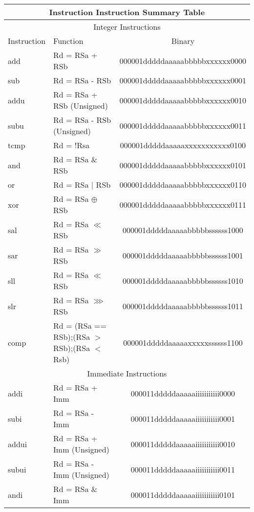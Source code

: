 \documentclass[letterpaper, 11pt]{article}
\begin{document}
	\begin{center}
		\begin{longtable}{|l|l|c|}
			\multicolumn{3}{c}{Instruction Instruction Summary Table} \\ \hline
			\multicolumn{3}{|c|}{Integer Instructions} \\ \hline
			Instruction & Function 										& Binary \\ \hline
			add			& Rd = RSa + RSb 								& 000001dddddaaaaabbbbbxxxxxx0000 \\
			sub			& Rd = RSa - RSb 								& 000001dddddaaaaabbbbbxxxxxx0001 \\
			addu		& Rd = RSa + RSb (Unsigned) 					& 000001dddddaaaaabbbbbxxxxxx0010 \\
			subu		& Rd = RSa - RSb (Unsigned)					 	& 000001dddddaaaaabbbbbxxxxxx0011 \\
			tcmp		& Rd = !Rsa	 									& 000001dddddaaaaaxxxxxxxxxxx0100 \\
			and			& Rd = RSa \& RSb								& 000001dddddaaaaabbbbbxxxxxx0101 \\
			or			& Rd = RSa $|$ RSb 								& 000001dddddaaaaabbbbbxxxxxx0110 \\
			xor			& Rd = RSa $\oplus$ RSb 						& 000001dddddaaaaabbbbbxxxxxx0111 \\
			sal			& Rd = RSa $\ll$ RSb 							& 000001dddddaaaaabbbbbssssss1000 \\
			sar			& Rd = RSa $\gg$ RSb 							& 000001dddddaaaaabbbbbssssss1001 \\
			sll			& Rd = RSa $\ll$ RSb 							& 000001dddddaaaaabbbbbssssss1010 \\
			slr			& Rd = RSa $ \ggg  $ RSb 						& 000001dddddaaaaabbbbbssssss1011 \\
			comp		& Rd = (RSa == RSb);(RSa $>$ RSb);(RSa $<$ Rsb)	& 000001dddddaaaaaxxxxxssssss1100 \\
			\hline
			\multicolumn{3}{|c|}{Immediate Instructions} \\ \hline
			addi		& Rd = RSa + Imm 								& 000011dddddaaaaaiiiiiiiiiii0000 \\
			subi		& Rd = RSa - Imm 								& 000011dddddaaaaaiiiiiiiiiii0001 \\
			addui		& Rd = RSa + Imm (Unsigned)						& 000011dddddaaaaaiiiiiiiiiii0010 \\
			subui		& Rd = RSa - Imm (Unsigned)					 	& 000011dddddaaaaaiiiiiiiiiii0011 \\
			andi		& Rd = RSa \& Imm								& 000011dddddaaaaaiiiiiiiiiii0101 \\

\end{longtable}
\end{center}
\end{document}
